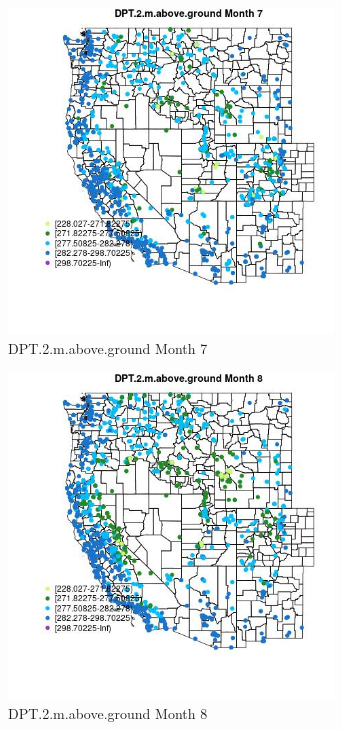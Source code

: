 \begin{figure} 
\centering  
\includegraphics[width=0.77\textwidth]{Code_Outputs/Report_ML_input_PM25_Step4_part_f_de_duplicated_aves_prioritize_24hr_obswNAs_MapObsMo7DPT2maboveground.jpg} 
\caption{\label{fig:Report_ML_input_PM25_Step4_part_f_de_duplicated_aves_prioritize_24hr_obswNAsMapObsMo7DPT2maboveground}DPT.2.m.above.ground Month 7} 
\end{figure} 
 

\begin{figure} 
\centering  
\includegraphics[width=0.77\textwidth]{Code_Outputs/Report_ML_input_PM25_Step4_part_f_de_duplicated_aves_prioritize_24hr_obswNAs_MapObsMo8DPT2maboveground.jpg} 
\caption{\label{fig:Report_ML_input_PM25_Step4_part_f_de_duplicated_aves_prioritize_24hr_obswNAsMapObsMo8DPT2maboveground}DPT.2.m.above.ground Month 8} 
\end{figure} 
 

